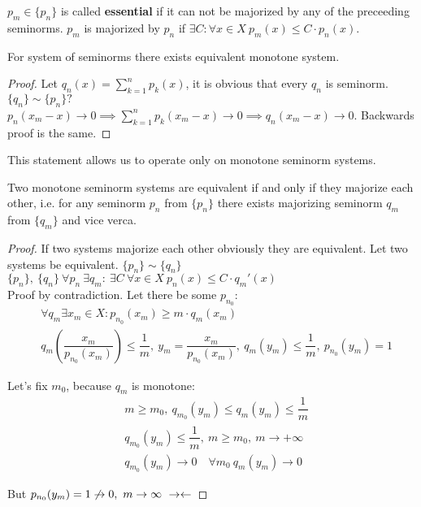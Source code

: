 \begin{defn}
  $p_m \in \{p_n\}$ is called \textbf{essential} if it can not be majorized by any of
  the preceeding seminorms. $p_m$ is majorized by $p_n$ if $\exists C: \forall x \in X\
  p_m(x) \leq C \cdot p_n(x)$.
\end{defn}

\begin{stm}
  For system of seminorms there exists equivalent monotone system.
\end{stm}

\begin{proof}
  Let $q_n(x) = \sum\limits_{k = 1}^n p_k(x)$, it is obvious that every $q_n$ is
  seminorm. $\{q_n\} \sim \{p_n\}?$ \\
  $p_n(x_m - x) \to 0 \implies \sum\limits_{k = 1}^n p_k(x_m - x) \to 0 \implies
  q_n(x_m - x) \to 0$. Backwards proof is the same.
\end{proof}

\noindent
This statement allows us to operate only on monotone seminorm systems.
\begin{stm}
  \label{stm:seminorm_equiv}
  Two monotone seminorm systems are equivalent if and only if they majorize
  each other, i.e. for any seminorm $p_n$ from $\{p_n\}$ there exists majorizing
  seminorm $q_m$ from $\{q_m\}$ and vice verca.
\end{stm}

\begin{proof}
  If two systems majorize each other obviously they are equivalent. 
  Let two systems be equivalent. $\{p_n\} \sim \{q_n\}$ \\
  $\{p_n\},\ \{q_n\}\ \forall p_n\ \exists q_m \colon\ \exists C\ \forall
  x \in X\ p_n(x) \leq C \cdot q_m'(x)$ \\
  Proof by contradiction. Let there be some $p_{n_0} \colon$
  \begin{align*}
    &\forall q_m \exists x_m \in X \colon p_{n_0}(x_m) \geq m \cdot q_m(x_m) \\
    &q_m(\dfrac{x_m}{p_{n_0}(x_m)}) \leq \dfrac 1m,\ y_m =
      \dfrac{x_m}{p_{n_0}(x_m)},\ q_m(y_m) \leq \dfrac 1m,\ p_{n_0}(y_m) = 1
  \end{align*}

  Let's fix $m_0$, because $q_m$ is monotone:
  \begin{align*}
    &m \geq m_0,\ q_{m_0}(y_m) \leq q_m(y_m) \leq \dfrac{1}{m} \\ 
    &q_{m_0}(y_m) \leq \dfrac 1m,\ m \geq m_0,\ m \to +\infty \\
    &q_{m_0}(y_m) \to 0\quad \forall m_0\ q_m(y_m) \to 0
  \end{align*}

  But $p_{n_0}(y_m) = 1 \not\to 0,\ m\to \infty\ \rightarrow\leftarrow$
\end{proof}

